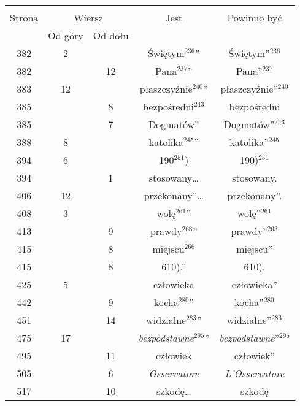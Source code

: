 \documentclass[a4paper,11pt]{article}
\begin{document}
\begin{center}
  \begin{tabular}{|c|c|c|c|c|}
    \hline
    & \multicolumn{2}{c|}{} & & \\
    Strona & \multicolumn{2}{c|}{Wiersz} & Jest
                              & Powinno być \\ \cline{2-3}
    & Od góry & Od dołu & & \\
    \hline
    382 &  2 & & Świętym$^{ 236 }$” & Świętym”$^{ 236 }$ \\
    382 & & 12 & Pana$^{ 237 }$” & Pana”$^{ 237 }$ \\
    383 & 12 & & płaszczyźnie$^{ 240 }$” & płaszczyźnie”$^{ 240 }$ \\
    385 & &  8 & bezpośredni$^{ 243 }$ & bezpośredni \\
    385 & &  7 & Dogmatów” & Dogmatów”$^{ 243 }$ \\
    388 &  8 & & katolika$^{ 245 }$” & katolika”$^{ 245 }$ \\
    394 &  6 & & 190$^{ 251 }$) & 190)$^{ 251 }$ \\
    394 & &  1 & stosowany\ldots & stosowany. \\
    406 & 12 & & przekonany”\ldots & przekonany”. \\
    408 &  3 & & wolę$^{ 261 }$” & wolę”$^{ 261 }$ \\
    413 & &  9 & prawdy$^{ 263 }$” & prawdy”$^{ 263 }$ \\
    415 & &  8 & miejscu$^{ 266 }$ & miejscu” \\
    415 & &  8 & 610).” & 610). \\
    425 &  5 & & człowieka & człowieka” \\
    442 & &  9 & kocha$^{ 280 }$” & kocha”$^{ 280 }$ \\
    451 & & 14 & widzialne$^{ 283 }$” & widzialne”$^{ 283 }$ \\
    475 & 17 & & \textit{bezpodstawne}$^{ 295 }$”
           & \textit{bezpodstawne}”$^{ 295 }$ \\
    495 & & 11 & człowiek & człowiek” \\
    505 & &  6 & \textit{Osservatore} & \textit{L'Osservatore} \\
    517 & & 10 & szkodę\ldots & szkodę \\
    \hline
  \end{tabular}

\end{center}
\end{document}
